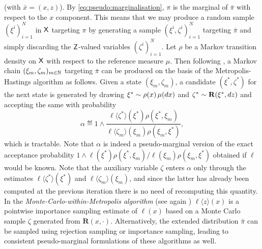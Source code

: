 (with $\bar{x} = (x, z)$). By \eqref{eq:pseudo:marginalisation}, $\pi$ is the marginal of $\bar{\pi}$ with respect to the $x$ component. This means that we may produce a random sample $(\xi^i)_{i = 1}^N$ in $\mathsf{X}$ targeting $\pi$ by generating a sample $(\xi^i, \zeta^i)_{i = 1}^N$ targeting $\bar{\pi}$ and simply discarding the $\mathsf{Z}$-valued variables $(\zeta^i)_{i = 1}^N$. Let $\rho$ be a Markov transition density on $\mathsf{X}$ with respect to the reference measure $\mu$. Then following \cite{andrieu:robert:2009}, a Markov chain $(\xi_m, \zeta_m)_{m \in \mathbb{N}}$ targeting $\bar{\pi}$ can be produced on the basis of the Metropolis-Hastings algorithm as follows. Given a state $(\xi_m, \zeta_m)$, a candidate $(\xi^\ast, \zeta^\ast)$ for the next state is generated by drawing $\xi^\ast \sim \rho(x) \, \mu(d x)$ and $\zeta^\ast \sim \mathbf{R}(\xi^\ast, d z)$ and accepting the same with probability 
$$
\alpha \eqdef 1 \wedge \frac{\ell \langle \zeta^\ast \rangle(\xi^\ast) \rho(\xi^\ast, \xi_m)}{\ell \langle \zeta_m \rangle (\xi_m) \rho(\xi_m, \xi^\ast)},  
$$
which is tractable. Note that $\alpha$ is indeed a pseudo-marginal version of the exact acceptance probability $1 \wedge \ell (\xi^\ast) \rho(\xi^\ast, \xi_m) / \ell (\xi_m) \rho(\xi_m, \xi^\ast)$ obtained if $\ell$ would be known. Note that the auxiliary variable $\zeta$ enters $\alpha$ only through the estimates $\ell \langle \zeta^\ast \rangle (\xi^\ast)$ and $\ell \langle \zeta_m \rangle (\xi_m)$, and since the latter has already been computed at the previous iteration there is no need of recomputing this quantity. In the \emph{Monte-Carlo-within-Metropolis algorithm} (see again \cite{andrieu:robert:2009}) $\ell \langle z \rangle(x)$ is a pointwise importance sampling estimate of $\ell(x)$ based on a Monte Carlo sample $\zeta$ generated from $\mathbf{R}(x, \cdot)$. Alternatively, the extended distribution $\bar{\pi}$ can be sampled using rejection sampling or importance sampling, leading to consistent pseudo-marginal formulations of these algorithms as well. 

